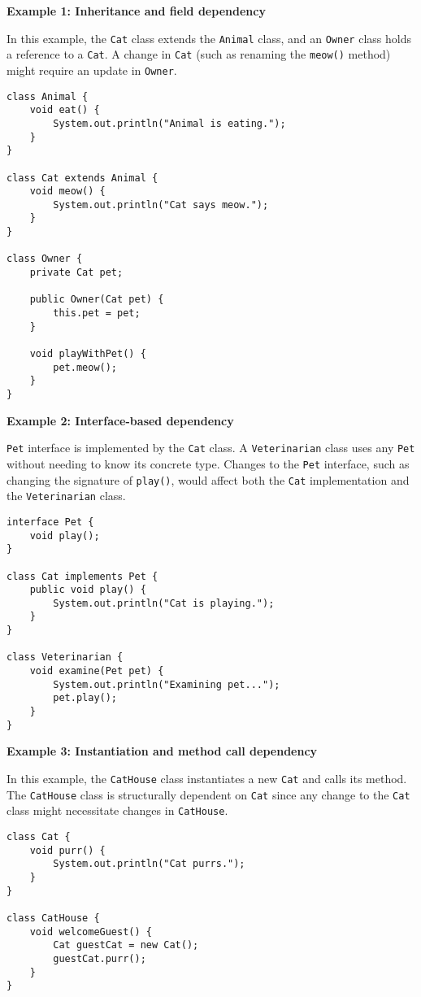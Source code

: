\textbf{Example 1: Inheritance and field dependency}

In this example, the \texttt{Cat} class extends the \texttt{Animal} class, and an \texttt{Owner} class holds a reference to a \texttt{Cat}. A change in \texttt{Cat} (such as renaming the \texttt{meow()} method) might require an update in \texttt{Owner}.

\begin{verbatim}
class Animal {
    void eat() {
        System.out.println("Animal is eating.");
    }
}

class Cat extends Animal {
    void meow() {
        System.out.println("Cat says meow.");
    }
}

class Owner {
    private Cat pet; 

    public Owner(Cat pet) {
        this.pet = pet;
    }

    void playWithPet() {
        pet.meow(); 
    }
}
\end{verbatim}

\medskip

\textbf{Example 2: Interface-based dependency}

\texttt{Pet} interface is implemented by the \texttt{Cat} class. A \texttt{Veterinarian} class uses any \texttt{Pet} without needing to know its concrete type. Changes to the \texttt{Pet} interface, such as changing the signature of \texttt{play()}, would affect both the \texttt{Cat} implementation and the \texttt{Veterinarian} class.

\begin{verbatim}
interface Pet {
    void play();
}

class Cat implements Pet {
    public void play() {
        System.out.println("Cat is playing.");
    }
}

class Veterinarian {
    void examine(Pet pet) {
        System.out.println("Examining pet...");
        pet.play();
    }
}
\end{verbatim}

\medskip

\textbf{Example 3: Instantiation and method call dependency}

In this example, the \texttt{CatHouse} class instantiates a new \texttt{Cat} and calls its method. The \texttt{CatHouse} class is structurally dependent on \texttt{Cat} since any change to the \texttt{Cat} class might necessitate changes in \texttt{CatHouse}.

\begin{verbatim}
class Cat {
    void purr() {
        System.out.println("Cat purrs.");
    }
}

class CatHouse {
    void welcomeGuest() {
        Cat guestCat = new Cat(); 
        guestCat.purr();  
    }
}
\end{verbatim}



